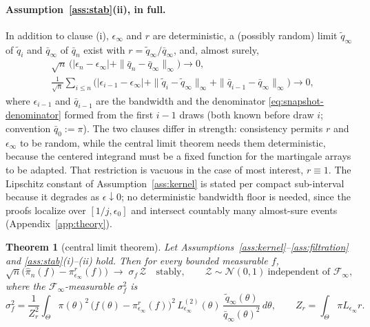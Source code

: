 \documentclass[10pt]{article}
\theoremstyle{plain}
\newtheorem{theorem}{Theorem}
\theoremstyle{definition}
\begin{document}
\paragraph{Assumption~\ref{ass:stab}(ii), in full.} In addition to clause (i), $\epsilon_\infty$ and $r$ are deterministic, a (possibly random) limit $\tilde q_\infty$ of $\tilde q_i$ and $\bar q_\infty$ of $\bar q_n$ exist with $r=\tilde q_\infty/\bar q_\infty$, and, almost surely,
\begin{equation}
\begin{aligned}
&\sqrt n\,\bigl(|\epsilon_n-\epsilon_\infty|+\|\bar q_n-\bar q_\infty\|_\infty\bigr)\to0,\\
&\tfrac{1}{\sqrt n}\textstyle\sum_{i\le n}\bigl(|\epsilon_{i-1}-\epsilon_\infty|+\|\tilde q_i-\tilde q_\infty\|_\infty+\|\bar q_{i-1}-\bar q_\infty\|_\infty\bigr)\to0,
\end{aligned}
\label{eq:rate}
\end{equation}
where $\epsilon_{i-1}$ and $\bar q_{i-1}$ are the bandwidth and the denominator \eqref{eq:snapshot-denominator} formed from the first $i-1$ draws (both known before draw $i$; convention $\bar q_0:=\pi$). The two clauses differ in strength: consistency permits $r$ and $\epsilon_\infty$ to be random, while the central limit theorem needs them deterministic, because the centered integrand must be a fixed function for the martingale arrays to be adapted. That restriction is vacuous in the case of most interest, $r\equiv1$. The Lipschitz constant of Assumption~\ref{ass:kernel} is stated per compact sub-interval because it degrades as $\epsilon\downarrow0$; no deterministic bandwidth floor is needed, since the proofs localize over $[1/j,\epsilon_0]$ and intersect countably many almost-sure events (Appendix~\ref{app:theory}).

\begin{theorem}[central limit theorem]\label{thm:clt}
Let Assumptions~\ref{ass:kernel}--\ref{ass:filtration} and \ref{ass:stab}(i)--(ii) hold. Then for every bounded measurable $f$,
\begin{equation}
\sqrt{n}\bigl(\widehat\pi_n(f)-\pi^r_{\epsilon_\infty}(f)\bigr)\;\longrightarrow\;\sigma_f\,\mathcal{Z}
\quad\text{stably},\qquad \mathcal{Z}\sim\mathcal{N}(0,1)\ \text{independent of }\mathcal{F}_\infty,
\label{eq:clt-conv}
\end{equation}
where the $\mathcal{F}_\infty$-measurable $\sigma^2_f$ is
\begin{equation}
\sigma_f^2=\frac{1}{Z_r^{2}}\int_\Theta \pi(\theta)^2\,\bigl(f(\theta)-\pi^r_{\epsilon_\infty}(f)\bigr)^2\,L^{(2)}_{\epsilon_\infty}(\theta)\,\frac{\tilde q_\infty(\theta)}{\bar q_\infty(\theta)^2}\,d\theta,
\qquad Z_r=\int_\Theta\pi L_{\epsilon_\infty}r .
\label{eq:clt-variance}
\end{equation}
\end{theorem}
\end{document}
